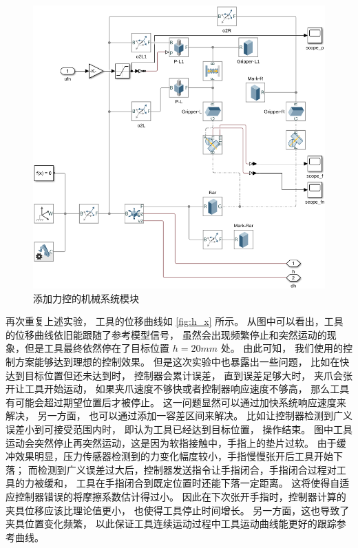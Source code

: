 \begin{figure}[!ht]
  \centering
  \includegraphics[width=13.5cm]{chapter04/pic/mech_x}
  \caption{\label{fig:mech_x}
    添加力控的机械系统模块}
  \vspace{-0.3cm}
\end{figure}

再次重复上述实验， 工具的位移曲线如 \ref{fig:h_x} 所示。
从图中可以看出，工具的位移曲线依旧能跟随了参考模型信号，
虽然会出现频繁停止和突然运动的现象，但是工具最终依然停在了目标位置 $h = 20 mm$ 处。
由此可知， 我们使用的控制方案能够达到理想的控制效果。
但是这次实验中也暴露出一些问题， 比如在快达到目标位置但还未达到时，
控制器会累计误差， 直到误差足够大时， 夹爪会张开让工具开始运动，
如果夹爪速度不够快或者控制器响应速度不够高， 那么工具有可能会超过期望位置后才被停止。
这一问题显然可以通过加快系统响应速度来解决， 另一方面， 也可以通过添加一容差区间来解决。
比如让控制器检测到广义误差小到可接受范围内时， 即认为工具已经达到目标位置， 操作结束。
图中工具运动会突然停止再突然运动，这是因为软指接触中，手指上的垫片过软。
由于缓冲效果明显，压力传感器检测到的力变化幅度较小，手指慢慢张开后工具开始下落；
而检测到广义误差过大后，控制器发送指令让手指闭合，手指闭合过程对工具的力被缓和，
工具在手指闭合到既定位置时还能下落一定距离。
这将使得自适应控制器错误的将摩擦系数估计得过小。
因此在下次张开手指时，控制器计算的夹具位移应该比理论值更小， 也使得工具停止时间增长。
另一方面，这也导致了夹具位置变化频繁，
以此保证工具连续运动过程中工具运动曲线能更好的跟踪参考曲线。


